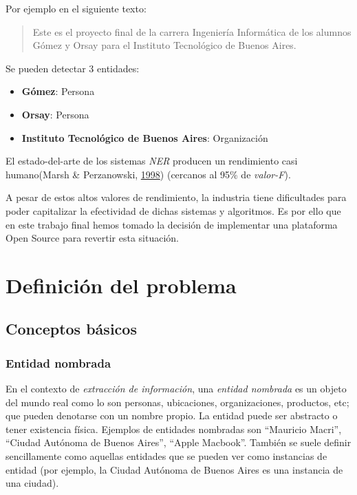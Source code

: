 \documentclass[12pt,a4paper,]{scrartcl}
\providecommand{\tightlist}{%
  \setlength{\itemsep}{0pt}\setlength{\parskip}{0pt}}
\begin{document}
Por ejemplo en el siguiente texto:

\begin{quote}
Este es el proyecto final de la carrera Ingeniería Informática de los alumnos Gómez y Orsay para el Instituto Tecnológico de Buenos Aires.
\end{quote}

Se pueden detectar 3 entidades:

\begin{itemize}
\tightlist
\item
  \textbf{Gómez}: Persona
\item
  \textbf{Orsay}: Persona
\item
  \textbf{Instituto Tecnológico de Buenos Aires}: Organización
\end{itemize}

El estado-del-arte de los sistemas \emph{NER} producen un rendimiento casi humano(Marsh \& Perzanowski, \protect\hyperlink{ref-marsh-perzanowski-1998-muc}{1998}) (cercanos al 95\% de \emph{valor-F}).

A pesar de estos altos valores de rendimiento, la industria tiene dificultades para poder capitalizar la efectividad de dichas sistemas y algoritmos.
Es por ello que en este trabajo final hemos tomado la decisión de implementar una plataforma Open Source para revertir esta situación.

\newpage

\hypertarget{problem-definition}{%
\section{Definición del problema}\label{problem-definition}}

\hypertarget{conceptos-buxe1sicos}{%
\subsection{Conceptos básicos}\label{conceptos-buxe1sicos}}

\hypertarget{entidad-nombrada}{%
\subsubsection{Entidad nombrada}\label{entidad-nombrada}}

En el contexto de \emph{extracción de información}, una \emph{entidad nombrada} es un objeto del mundo real como lo son personas, ubicaciones, organizaciones, productos, etc; que pueden denotarse con un nombre propio. La entidad puede ser abstracto o tener existencia física. Ejemplos de entidades nombradas son \enquote{Mauricio Macri}, \enquote{Ciudad Autónoma de Buenos Aires}, \enquote{Apple Macbook}.
También se suele definir sencillamente como aquellas entidades que se pueden ver como instancias de entidad (por ejemplo, la Ciudad Autónoma de Buenos Aires es una instancia de una ciudad).
\end{document}
